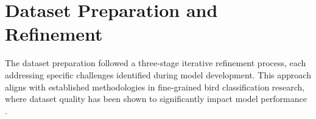 \documentclass[a4paper,12pt]{report}
\begin{document}






\section{Dataset Preparation and Refinement}

The dataset preparation followed a three-stage iterative refinement process, each addressing specific challenges identified during model development. This approach aligns with established methodologies in fine-grained bird classification research, where dataset quality has been shown to significantly impact model performance \citet{ghani2024}.
\end{document}
